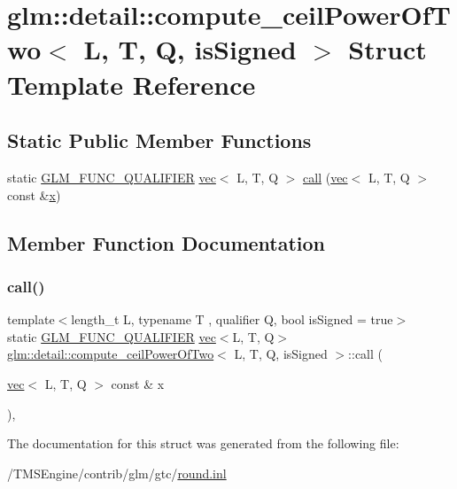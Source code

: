 \hypertarget{structglm_1_1detail_1_1compute__ceil_power_of_two}{}\section{glm\+:\+:detail\+:\+:compute\+\_\+ceil\+Power\+Of\+Two$<$ L, T, Q, is\+Signed $>$ Struct Template Reference}
\label{structglm_1_1detail_1_1compute__ceil_power_of_two}
\subsection*{Static Public Member Functions}
\begin{DoxyCompactItemize}
\item 
static \hyperlink{setup_8hpp_a33fdea6f91c5f834105f7415e2a64407}{G\+L\+M\+\_\+\+F\+U\+N\+C\+\_\+\+Q\+U\+A\+L\+I\+F\+I\+ER} \hyperlink{structglm_1_1vec}{vec}$<$ L, T, Q $>$ \hyperlink{structglm_1_1detail_1_1compute__ceil_power_of_two_aa074d3ad43e792925268c9295c734054}{call} (\hyperlink{structglm_1_1vec}{vec}$<$ L, T, Q $>$ const \&\hyperlink{_s_d_l__opengl_8h_ad0e63d0edcdbd3d79554076bf309fd47}{x})
\end{DoxyCompactItemize}


\subsection{Member Function Documentation}
\mbox{\label{structglm_1_1detail_1_1compute__ceil_power_of_two_aa074d3ad43e792925268c9295c734054}} 
\subsubsection{\texorpdfstring{call()}{call()}}
{\footnotesize\ttfamily template$<$length\+\_\+t L, typename T , qualifier Q, bool is\+Signed = true$>$ \\
static \hyperlink{setup_8hpp_a33fdea6f91c5f834105f7415e2a64407}{G\+L\+M\+\_\+\+F\+U\+N\+C\+\_\+\+Q\+U\+A\+L\+I\+F\+I\+ER} \hyperlink{structglm_1_1vec}{vec}$<$L, T, Q$>$ \hyperlink{structglm_1_1detail_1_1compute__ceil_power_of_two}{glm\+::detail\+::compute\+\_\+ceil\+Power\+Of\+Two}$<$ L, T, Q, is\+Signed $>$\+::call (\begin{DoxyParamCaption}\item[{\hyperlink{structglm_1_1vec}{vec}$<$ L, T, Q $>$ const \&}]{x }\end{DoxyParamCaption})\hspace{0.3cm}{\ttfamily [inline]}, {\ttfamily [static]}}



The documentation for this struct was generated from the following file\+:\begin{DoxyCompactItemize}
\item 
/\+T\+M\+S\+Engine/contrib/glm/gtc/\hyperlink{round_8inl}{round.\+inl}\end{DoxyCompactItemize}
